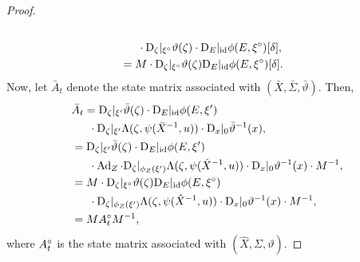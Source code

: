 \documentclass{article}
\begin{document}
\begin{proof}
\begin{align*}
    \\ &\phantom{==}
    \cdot \mathrm{D}_\zeta |_{{\xi}^\circ} \vartheta(\zeta)
    \cdot \mathrm{D}_E |_{\mathrm{id}} \phi(E, {\xi}^\circ)[\delta], \\
    &= M \cdot \mathrm{D}_\zeta |_{{\xi}^\circ} \vartheta(\zeta) \mathrm{D}_E |_{\mathrm{id}} \phi(E, {\xi}^\circ)[\delta].
\end{align*}
Now, let $\bar{A}_t$ denote the state matrix associated with $(\bar{X}, \bar{\Sigma}, \bar{\vartheta})$.
Then,
\begin{align*}
    &\bar{A}_t
    = \mathrm{D}_\zeta |_{\xi'} \bar{\vartheta}(\zeta ) \cdot \mathrm{D}_E |_{\mathrm{id}} \phi(E, \xi')
    \\ &\phantom{==}
    \cdot \mathrm{D}_{\zeta}|_{\xi'} \Lambda(\zeta, \psi(\bar{X}^{-1}, u)) \cdot \mathrm{D}_x |_0 \bar{\vartheta}^{-1}(x), \\
    &= \mathrm{D}_\zeta |_{\xi'} \bar{\vartheta}(\zeta ) \cdot \mathrm{D}_E |_{\mathrm{id}} \phi(E, \xi')
    \\ &\phantom{==}
    \cdot \operatorname{Ad}_Z \cdot \mathrm{D}_{\zeta}|_{\phi_Z(\xi')} \Lambda(\zeta, \psi(\hat{X}^{-1}, u)) \cdot
    \mathrm{D}_x|_0 \vartheta^{-1} (x) \cdot M^{-1}, \\
    &=  M \cdot \mathrm{D}_\zeta |_{{\xi}^\circ} \vartheta(\zeta) \mathrm{D}_E |_{\mathrm{id}} \phi(E, {\xi}^\circ)
    \\ &\phantom{==}
    \cdot \mathrm{D}_{\zeta}|_{\phi_Z(\xi')} \Lambda(\zeta, \psi(\hat{X}^{-1}, u)) \cdot
    \mathrm{D}_x|_0 \vartheta^{-1} (x) \cdot M^{-1}, \\
    &=  M {A}^\circ_t M^{-1},
\end{align*}
where ${A}^\circ_t$ is the state matrix associated with $(\hat{X}, \Sigma, \vartheta)$.


\end{proof}
\end{document}

